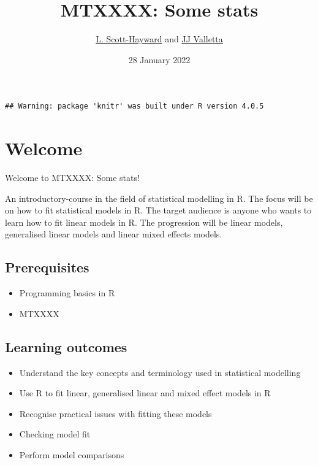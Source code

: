 \documentclass[
  british,
  oneside]{krantz}
\title{MTXXXX: Some stats}
\author{\href{lass@st-andrews.ac.uk}{L. Scott-Hayward} and \href{jjv1@st-andrews.ac.uk}{JJ Valletta}}
\date{28 January 2022}
\providecommand{\tightlist}{%
  \setlength{\itemsep}{0pt}\setlength{\parskip}{0pt}}
\theoremstyle{definition}
\theoremstyle{definition}
\theoremstyle{definition}
\theoremstyle{definition}
\theoremstyle{remark}
\begin{document}
\maketitle

{
\hypersetup{linkcolor=}
\setcounter{tocdepth}{2}
\tableofcontents
}
\begin{verbatim}
## Warning: package 'knitr' was built under R version 4.0.5
\end{verbatim}

\hypertarget{welcome}{%
\chapter*{Welcome}\label{welcome}}


Welcome to MTXXXX: Some stats!

An introductory-course in the field of statistical modelling in R. The focus will be on how to fit statistical models in R. The target audience is anyone who wants to learn how to fit linear models in R. The progression will be linear models, generalised linear models and linear mixed effects models.

\hypertarget{prerequisites}{%
\section*{Prerequisites}\label{prerequisites}}


\begin{itemize}
\tightlist
\item
  Programming basics in R
\item
  MTXXXX
\end{itemize}

\hypertarget{learning-outcomes}{%
\section*{Learning outcomes}\label{learning-outcomes}}


\begin{itemize}
\tightlist
\item
  Understand the key concepts and terminology used in statistical modelling
\item
  Use R to fit linear, generalised linear and mixed effect models in R
\item
  Recognise practical issues with fitting these models
\item
  Checking model fit
\item
  Perform model comparisons
\end{itemize}
\end{document}
